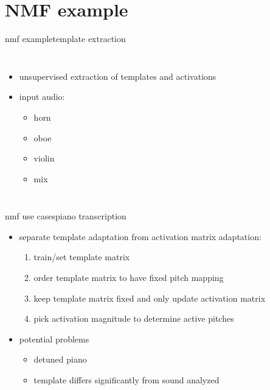     \section[example]{NMF example}
        \begin{frame}{nmf example}{template extraction}
            \vspace{-3mm}
            \begin{columns}
                    \begin{itemize}
                        \item   unsupervised extraction of templates and activations
                        \item   input audio: 
                            \begin{itemize}
                                \item  {} horn
                                \item  {} oboe
                                \item  {} violin
                                \item  {} mix
                            \end{itemize}
                    \end{itemize}
            \end{columns}
        \end{frame}
        
        \begin{frame}{nmf use cases}{piano transcription}
            \begin{itemize}
                \item   separate template adaptation from activation matrix adaptation:
                    \begin{enumerate}
                        \item  train/set template matrix
                        \item  order template matrix to have fixed pitch mapping
                        \item  keep template matrix fixed and only update activation matrix
                        \item  pick activation magnitude to determine active pitches
                    \end{enumerate}
                \bigskip
                \item   potential problems
                    \begin{itemize}
                        \item   detuned piano
                        \item   template differs significantly from sound analyzed
                    \end{itemize}
            \end{itemize}
        \end{frame}
        
